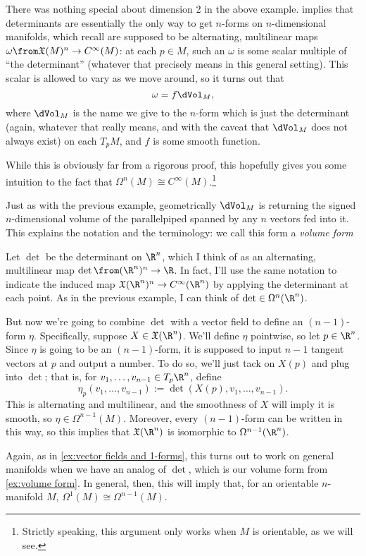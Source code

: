 \begin{example}\label{ex:volume form}
	There was nothing special about dimension 2 in the above example.  implies that determinants are essentially the only way to get $n$-forms on $n$-dimensional manifolds, which recall are supposed to be alternating, multilinear maps $\omega \from \mathfrak{X}(M)^n \to C^\infty(M)$: at each $p\in M$, such an $\omega$ is some scalar multiple of ``the determinant'' (whatever that precisely means in this general setting). This scalar is allowed to vary as we move around, so it turns out that 
	\[
		\omega = f \dVol_M,
	\]
	where $\dVol_M$ is the name we give to the $n$-form which is just the determinant (again, whatever that really means, and with the caveat that $\dVol_M$ does not always exist) on each $T_pM$, and $f$ is some smooth function. 
	
	While this is obviously far from a rigorous proof, this hopefully gives you some intuition to the fact that $\Omega^n(M) \cong C^\infty(M)$.\footnote{Strictly speaking, this argument only works when $M$ is orientable, as we will see.}
	
	Just as with the previous example, geometrically $\dVol_M$ is returning the signed $n$-dimensional volume of the parallelpiped spanned by any $n$ vectors fed into it. This explains the notation and the terminology: we call this form a \emph{volume form}
\end{example}

\begin{example}\label{ex:n-1 forms}
	Let $\det$ be the determinant on $\R^n$, which I think of as an alternating, multilinear map $\det \from (\R^n)^n \to \R$. In fact, I'll use the same notation to indicate the induced map $\mathfrak{X}(\R^n)^n \to C^\infty(\R^n)$ by applying the determinant at each point. As in the previous example, I can think of $\det \in \Omega^n(\R^n)$.
	
	But now we're going to combine $\det$ with a vector field to define an $(n-1)$-form $\eta$. Specifically, suppose $X \in \mathfrak{X}(\R^n)$. We'll define $\eta$ pointwise, so let $p \in \R^n$. Since $\eta$ is going to be an $(n-1)$-form, it is supposed to input $n-1$ tangent vectors at $p$ and output a number. To do so, we'll just tack on $X(p)$ and plug into $\det$; that is, for $v_1, \dots , v_{n-1} \in T_p \R^n$, define
	\[
		\eta_p(v_1, \dots , v_{n-1}) := \det(X(p), v_1, \dots , v_{n-1}).
	\]
	This is alternating and multilinear, and the smoothness of $X$ will imply it is smooth, so $\eta \in \Omega^{n-1}(M)$. Moreover, every $(n-1)$-form can be written in this way, so this implies that $\mathfrak{X}(\R^n)$ is isomorphic to $\Omega^{n-1}(\R^n)$.
	
	Again, as in \cref{ex:vector fields and 1-forms}, this turns out to work on general manifolds when we have an analog of $\det$, which is our volume form from \cref{ex:volume form}. In general, then, this will imply that, for an orientable $n$-manifold $M$, $\Omega^1(M) \cong \Omega^{n-1}(M)$.
\end{example}